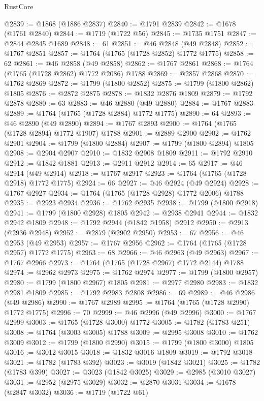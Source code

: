 \begin{lexlean}{RustCore}
\begin{coremodule}
@2839 := @1868 (@1886 @2837)
@2840 := @1791 @2839
@2842 := @1678 (@1761 @2840)
@2844 := @1719 (@1722 @56)
@2845 := @1735 @1751
@2847 := @2844 @2845 @1689
@2848 := 61
@2851 := @46 @2848 (@49 @2848)
@2852 := @1767 @2851
@2857 := @1764 (@1765 (@1728 @2852) @1772 @1775)
@2858 := 62
@2861 := @46 @2858 (@49 @2858)
@2862 := @1767 @2861
@2868 := @1764 (@1765 (@1728 @2862) @1772 @2086) @1788
@2869 := @2857 @2868
@2870 := @1762 @2869
@2872 := @1799 (@1800 @2852)
@2875 := @1799 (@1800 @2862) @1805
@2876 := @2872 @2875
@2878 := @1832 @2876 @1809
@2879 := @1792 @2878
@2880 := 63
@2883 := @46 @2880 (@49 @2880)
@2884 := @1767 @2883
@2889 := @1764 (@1765 (@1728 @2884) @1772 @1775)
@2890 := 64
@2893 := @46 @2890 (@49 @2890)
@2894 := @1767 @2893
@2900 := @1764 (@1765 (@1728 @2894) @1772 @1907) @1788
@2901 := @2889 @2900
@2902 := @1762 @2901
@2904 := @1799 (@1800 @2884)
@2907 := @1799 (@1800 @2894) @1805
@2908 := @2904 @2907
@2910 := @1832 @2908 @1809
@2911 := @1792 @2910
@2912 := @1842 @1881
@2913 := @2911 @2912
@2914 := 65
@2917 := @46 @2914 (@49 @2914)
@2918 := @1767 @2917
@2923 := @1764 (@1765 (@1728 @2918) @1772 @1775)
@2924 := 66
@2927 := @46 @2924 (@49 @2924)
@2928 := @1767 @2927
@2934 := @1764 (@1765 (@1728 @2928) @1772 @2006) @1788
@2935 := @2923 @2934
@2936 := @1762 @2935
@2938 := @1799 (@1800 @2918)
@2941 := @1799 (@1800 @2928) @1805
@2942 := @2938 @2941
@2944 := @1832 @2942 @1809
@2948 := @1792 @2944 (@1842 @1958) @2912
@2950 := @2913 (@2936 @2948)
@2952 := @2879 (@2902 @2950)
@2953 := 67
@2956 := @46 @2953 (@49 @2953)
@2957 := @1767 @2956
@2962 := @1764 (@1765 (@1728 @2957) @1772 @1775)
@2963 := 68
@2966 := @46 @2963 (@49 @2963)
@2967 := @1767 @2966
@2973 := @1764 (@1765 (@1728 @2967) @1772 @2144) @1788
@2974 := @2962 @2973
@2975 := @1762 @2974
@2977 := @1799 (@1800 @2957)
@2980 := @1799 (@1800 @2967) @1805
@2981 := @2977 @2980
@2983 := @1832 @2981 @1809
@2985 := @1792 @2983 @2808
@2986 := 69
@2989 := @46 @2986 (@49 @2986)
@2990 := @1767 @2989
@2995 := @1764 (@1765 (@1728 @2990) @1772 @1775)
@2996 := 70
@2999 := @46 @2996 (@49 @2996)
@3000 := @1767 @2999
@3003 := @1765 (@1728 @3000) @1772
@3005 := @1782 (@1783 @251)
@3008 := @1764 (@3003 @3005) @1788
@3009 := @2995 @3008
@3010 := @1762 @3009
@3012 := @1799 (@1800 @2990)
@3015 := @1799 (@1800 @3000) @1805
@3016 := @3012 @3015
@3018 := @1832 @3016 @1809
@3019 := @1792 @3018
@3021 := @1782 (@1783 @392)
@3023 := @3019 (@1842 @3021)
@3025 := @1782 (@1783 @399)
@3027 := @3023 (@1842 @3025)
@3029 := @2985 (@3010 @3027)
@3031 := @2952 (@2975 @3029)
@3032 := @2870 @3031
@3034 := @1678 (@2847 @3032)
@3036 := @1719 (@1722 @61)

\end{coremodule}
\end{lexlean}

